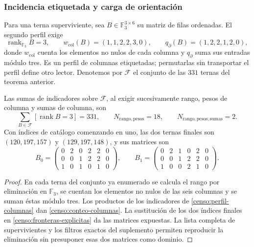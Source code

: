 \subsubsection{Incidencia etiquetada y carga de orientación}

Para una terna superviviente, sea \(B\in\mathbb F_3^{3\times6}\) su
matriz de filas ordenadas. El segundo perfil exige
\begin{equation}
 \operatorname{rank}_{\mathbb F_3}B=3,\qquad
 w_{\mathrm{col}}(B)=(1,1,2,2,3,0),\qquad
 q_{\partial}(B)=(1,2,2,1,2,0),
 \label{censo:perfil-columnas}
\end{equation}
donde \(w_{\mathrm{col}}\) cuenta los elementos no nulos de cada
columna y \(q_{\partial}\) suma sus entradas módulo tres. Es un perfil
de columnas etiquetadas; permutarlas sin transportar el perfil define otro
lector. Denotemos por \(\mathcal F\) el conjunto de las \(331\) ternas
del teorema anterior.

\begin{proposition}
\label{censo:dos-matrices}
Las sumas de indicadores sobre \(\mathcal F\), al exigir sucesivamente
rango, pesos de columna y sumas de columna, son
\begin{equation}
 \sum_{B\in\mathcal F}[\operatorname{rank}B=3]=331,
 \qquad N_{\mathrm{rango,pesos}}=18,
 \qquad N_{\mathrm{rango,pesos,sumas}}=2.
 \label{censo:conteo-columnas}
\end{equation}
Con índices de catálogo comenzando en uno, las dos ternas finales son
\((120,197,157)\) y \((129,197,148)\), y sus matrices son
\[
 B_0=\begin{pmatrix}0&2&0&2&2&0\\0&0&1&2&2&0\\1&0&1&0&1&0\end{pmatrix},
 \qquad
 B_1=\begin{pmatrix}0&2&1&0&2&0\\0&0&1&2&2&0\\1&0&0&2&1&0\end{pmatrix}.
\]
\end{proposition}
\begin{proof}
En cada terna del conjunto ya enumerado se calcula el rango por eliminación
en \(\mathbb F_3\), se cuentan los elementos no nulos de las seis
columnas y se suman éstas módulo tres. Los productos de los indicadores
de \eqref{censo:perfil-columnas} dan \eqref{censo:conteo-columnas}.
La sustitución de los dos índices finales en
\eqref{censo:fronteras-explicitas} da las matrices expuestas. La lista
completa de supervivientes y los filtros exactos del suplemento permiten
reproducir la eliminación sin presuponer esas dos matrices como dominio.
\end{proof}


